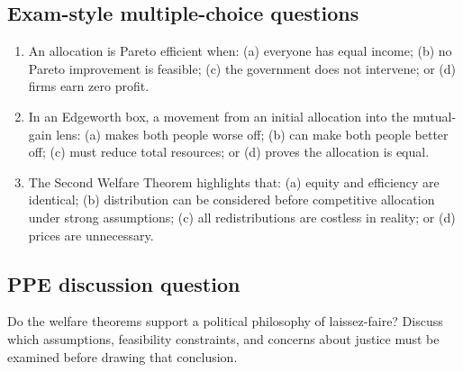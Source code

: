 \subsection*{Exam-style multiple-choice questions}
\begin{enumerate}[resume,label=\arabic*.]
  \item An allocation is Pareto efficient when: (a) everyone has equal income; (b) no Pareto improvement is feasible; (c) the government does not intervene; or (d) firms earn zero profit.
  \item In an Edgeworth box, a movement from an initial allocation into the mutual-gain lens: (a) makes both people worse off; (b) can make both people better off; (c) must reduce total resources; or (d) proves the allocation is equal.
  \item The Second Welfare Theorem highlights that: (a) equity and efficiency are identical; (b) distribution can be considered before competitive allocation under strong assumptions; (c) all redistributions are costless in reality; or (d) prices are unnecessary.
\end{enumerate}

\subsection*{PPE discussion question}

\noindent Do the welfare theorems support a political philosophy of laissez-faire?
Discuss which assumptions, feasibility constraints, and concerns about justice
must be examined before drawing that conclusion.
